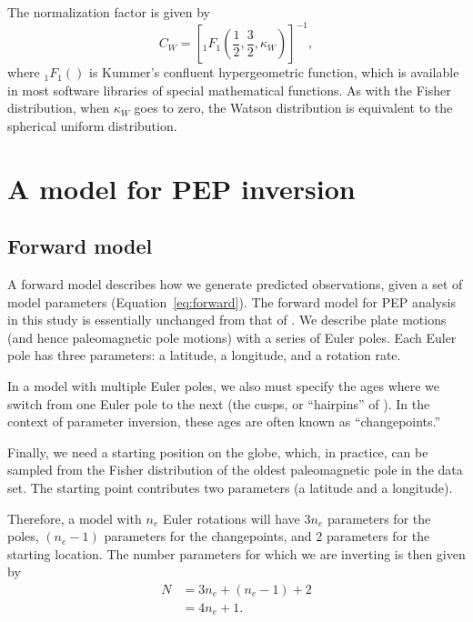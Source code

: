 \documentclass[11pt,letterpaper]{article}
\begin{document}
The normalization factor is given by
\begin{equation}
  C_W = \left[ {}_1 F_1 \left( \frac{1}{2}, \frac{3}{2}, \kappa_W \right) \right]^{-1},
\end{equation}
where ${}_1 F_1()$ is Kummer's confluent hypergeometric function, which is available in most software libraries of special mathematical functions. As with the Fisher distribution, when $\kappa_W$ goes to zero,  the Watson distribution is equivalent to the spherical uniform distribution.

\section*{A model for PEP inversion}
\label{sec:model}
\subsection*{Forward model}
\label{sec:forward_model}
A forward model describes how we generate predicted observations, given a set of model parameters (Equation~\eqref{eq:forward}). The forward model for PEP analysis in this study is essentially unchanged from that of \cite{Gordon1984a}. We describe plate motions (and hence paleomagnetic pole motions) with a series of Euler poles. Each Euler pole has three parameters: a latitude, a longitude, and a rotation rate.

In a model with multiple Euler poles, we also must specify the ages where we switch from one Euler pole to the next (the cusps, or ``hairpins'' of \cite{Irving1972a}). In the context of parameter inversion, these ages are often known as ``changepoints.''

Finally, we need a starting position on the globe, which, in practice, can be sampled from the Fisher distribution of the oldest paleomagnetic pole in the data set. The starting point contributes two parameters (a latitude and a longitude).

Therefore, a model with $n_e$ Euler rotations will have $3 n_e$ parameters for the poles, $(n_e-1)$ parameters for the changepoints, and 2 parameters for the starting location. The number parameters for which we are inverting is then given by
\begin{equation}
\begin{aligned}
N &= 3 n_e + (n_e -1) + 2 \\
 &= 4 n_e + 1.
\end{aligned}
\label{eq:n_parameters}
\end{equation}
\end{document}
